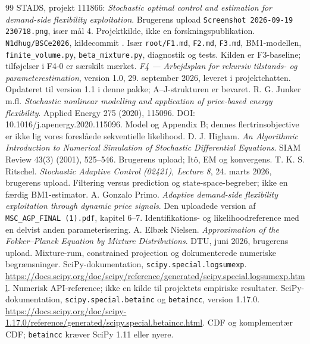 \begin{thebibliography}{99}
 STADS, projekt 111866: \emph{Stochastic optimal control and estimation for demand-side flexibility exploitation}. Brugerens upload \texttt{Screenshot 2026-09-19 230718.png}, især mål 4. Projektkilde, ikke en forskningspublikation.
 \texttt{N1dhug/BSCe2026}, kildecommit \basecommit. Især \texttt{root/F1.md}, \texttt{F2.md}, \texttt{F3.md}, BM1-modellen, \texttt{finite\_volume.py}, \texttt{beta\_mixture.py}, diagnostik og tests. Kilden er F3-baseline; tilføjelser i F4-0 er særskilt mærket.
 \emph{F4 --- Arbejdsplan for rekursiv tilstands- og parameterestimation}, version 1.0, 29. september 2026, leveret i projektchatten. Opdateret til version 1.1 i denne pakke; A--J-strukturen er bevaret.
 R. G. Junker m.fl. \emph{Stochastic nonlinear modelling and application of price-based energy flexibility}. Applied Energy 275 (2020), 115096. DOI: 10.1016/j.apenergy.2020.115096. Model og Appendix B; dennes flertrinsobjective er ikke lig vores foreslåede sekventielle likelihood.
 D. J. Higham. \emph{An Algorithmic Introduction to Numerical Simulation of Stochastic Differential Equations}. SIAM Review 43(3) (2001), 525--546. Brugerens upload; Itô, EM og konvergens.
 T. K. S. Ritschel. \emph{Stochastic Adaptive Control (02421), Lecture 8}, 24. marts 2026, brugerens upload. Filtering versus prediction og state-space-begreber; ikke en færdig BM1-estimator.
 A. Gonzalo Primo. \emph{Adaptive demand-side flexibility exploitation through dynamic price signals}. Den uploadede version af \texttt{MSC\_AGP\_FINAL (1).pdf}, kapitel 6--7. Identifikations- og likelihoodreference med en delvist anden parameterisering.
 A. Elbæk Nielsen. \emph{Approximation of the Fokker--Planck Equation by Mixture Distributions}. DTU, juni 2026, brugerens upload. Mixture-rum, constrained projection og dokumenterede numeriske begrænsninger.
 SciPy-dokumentation, \texttt{scipy.special.logsumexp}. \url{https://docs.scipy.org/doc/scipy/reference/generated/scipy.special.logsumexp.html}. Numerisk API-reference; ikke en kilde til projektets empiriske resultater.
 SciPy-dokumentation, \texttt{scipy.special.betainc} og \texttt{betaincc}, version 1.17.0. \url{https://docs.scipy.org/doc/scipy-1.17.0/reference/generated/scipy.special.betaincc.html}. CDF og komplementær CDF; \texttt{betaincc} kræver SciPy 1.11 eller nyere.
\end{thebibliography}
